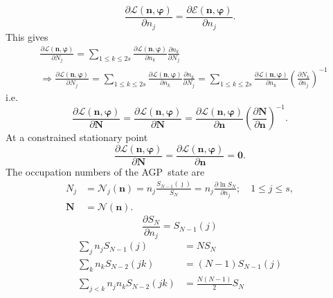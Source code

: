 \documentclass[aps,preprint]{revtex4}%
\begin{document}
\begin{equation}
\frac{\partial\mathcal{L}\left(  \mathbf{n,\varphi}\right)  }{\partial n_{j}%
}=\frac{\partial\mathcal{E}\left(  \mathbf{n,\varphi}\right)  }{\partial
n_{j}}.
\end{equation}
This gives
\begin{align}
&  \frac{\partial\mathcal{L}\left(  \mathbf{n,\varphi}\right)  }{\partial
N_{j}}=\sum_{1\leq k\leq2s}\frac{\partial\mathcal{L}\left(  \mathbf{n,\varphi
}\right)  }{\partial n_{k}}\frac{\partial n_{k}}{\partial N_{j}}\\
&  \Rightarrow\frac{\partial\mathcal{L}\left(  \mathbf{n,\varphi}\right)
}{\partial N_{j}}=\sum_{1\leq k\leq2s}\frac{\partial\mathcal{L}\left(
\mathbf{n,\varphi}\right)  }{\partial n_{k}}\frac{\partial n_{k}}{\partial
N_{j}}=\sum_{1\leq k\leq2s}\frac{\partial\mathcal{L}\left(  \mathbf{n,\varphi
}\right)  }{\partial n_{k}}\left(  \frac{\partial N_{k}}{\partial n_{j}%
}\right)  ^{-1}%
\end{align}
i.e.%
\begin{equation}
\frac{\partial\mathcal{L}\left(  \mathbf{n,\varphi}\right)  }{\partial
\mathbf{N}}=\frac{\partial\mathcal{L}\left(  \mathbf{n,\varphi}\right)
}{\partial\mathbf{N}}=\frac{\partial\mathcal{L}\left(  \mathbf{n,\varphi
}\right)  }{\partial\mathbf{n}}\left(  \frac{\partial\mathbf{N}}%
{\partial\mathbf{n}}\right)  ^{-1}.
\end{equation}
At a constrained stationary point
\begin{equation}
\frac{\partial\mathcal{L}\left(  \mathbf{n,\varphi}\right)  }{\partial
\mathbf{N}}=\frac{\partial\mathcal{L}\left(  \mathbf{n,\varphi}\right)
}{\partial\mathbf{n}}=\mathbf{0.}%
\end{equation}
The occupation numbers of the AGP\ state are
\begin{align}
N_{j}  &  =\mathcal{N}_{j}\left(  \mathbf{n}\right)  =n_{j}\frac
{S_{N-1}\left(  \jmath\right)  }{S_{N}}=n_{j}\frac{\partial\ln S_{N}}{\partial
n_{j}};\quad1\leq j\leq s,\\
\mathbf{N}  &  =\mathcal{N}\left(  \mathbf{n}\right)  .
\end{align}%
\begin{equation}
\frac{\partial S_{N}}{\partial n_{j}}=S_{N-1}\left(  j\right)
\end{equation}%
\begin{align}
\sum_{j}n_{j}S_{N-1}\left(  j\right)   &  =NS_{N}\\
\sum_{k}n_{k}S_{N-2}\left(  jk\right)   &  =\left(  N-1\right)  S_{N-1}\left(
j\right) \\
\sum_{j<k}n_{j}n_{k}S_{N-2}\left(  jk\right)   &  =\frac{N\left(  N-1\right)
}{2}S_{N}%
\end{align}
\end{document}
